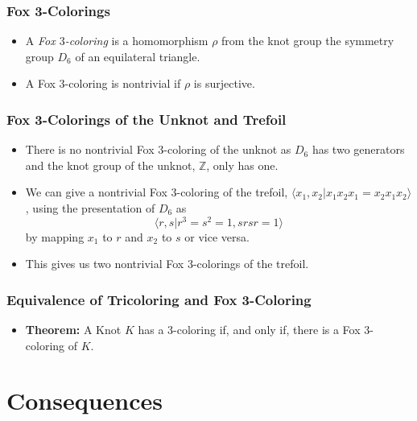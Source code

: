 \documentclass{beamer}
\begin{document}
\begin{frame}
  \frametitle{Fox 3-Colorings}
  \begin{itemize}
  \item A \textit{Fox $3$-coloring} is a homomorphism $\rho$ from
    the knot group the symmetry group $D_6$ of an equilateral
    triangle.
  \item A Fox $3$-coloring is nontrivial if $\rho$ is surjective.
  \end{itemize}
\end{frame}

\begin{frame}
  \frametitle{Fox 3-Colorings of the Unknot and Trefoil}
  \begin{itemize}
  \item There is no nontrivial Fox $3$-coloring of the unknot as
    $D_6$ has two generators and the knot group of the unknot, $\mathbb{Z}$,
    only has one.
  \item We can give a nontrivial Fox $3$-coloring of the trefoil,
    $\langle x_1,x_2|x_1 x_2 x_1= x_2 x_1 x_2\rangle$, using the presentation of $D_6$ as
    \[
      \langle r,s| r^3=s^2=1, srsr=1\rangle
    \]
    by mapping $x_1$ to $r$ and $x_2$ to $s$ or vice versa.
  \item This gives us two nontrivial Fox $3$-colorings of the trefoil.
   \end{itemize}
\end{frame}

\begin{frame}
  \frametitle{Equivalence of Tricoloring and Fox 3-Coloring}
  \begin{itemize}
  \item \textbf{Theorem:} A Knot $K$ has a $3$-coloring if, and only if,
    there is a Fox $3$-coloring of $K$.
  \end{itemize}
\end{frame}

\section{Consequences}
\end{document}
